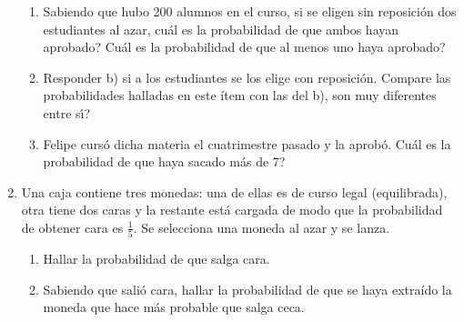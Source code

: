\documentclass[a4paper, 11pt]{article}
\begin{document}
\begin{enumerate}
\begin{enumerate}
\item Sabiendo que hubo 200 alumnos en el curso, si se eligen sin
reposici\'on dos estudiantes al azar, \textquestiondown cu\'{a}l es la probabilidad de que ambos
hayan aprobado? \textquestiondown Cu\'{a}l es la probabilidad de que al menos
uno haya aprobado?


\item Responder b) si a los estudiantes se los elige con reposici\'on. Compare las probabilidades halladas en este \'item con las del b), \textquestiondown son muy diferentes entre s\'{\i}?


\item Felipe curs\'{o} dicha materia el cuatrimestre pasado y la aprob\'{o}.
\textquestiondown Cu\'{a}l es la probabilidad de que haya sacado m\'{a}s de 7?


\end{enumerate}


\item Una caja contiene tres monedas: una de ellas es de curso legal (equilibrada), otra tiene dos caras y la restante est\'a cargada de modo que la probabilidad de obtener cara es $\frac{1}{5}$. Se selecciona una moneda al azar y se lanza.
\begin{enumerate}
\item Hallar la probabilidad de que salga cara.
\item Sabiendo que sali\'o cara, hallar la probabilidad de que se haya extra\'ido la moneda que hace m\'as probable que salga ceca.
\end{enumerate}



\end{enumerate}
\end{document}
